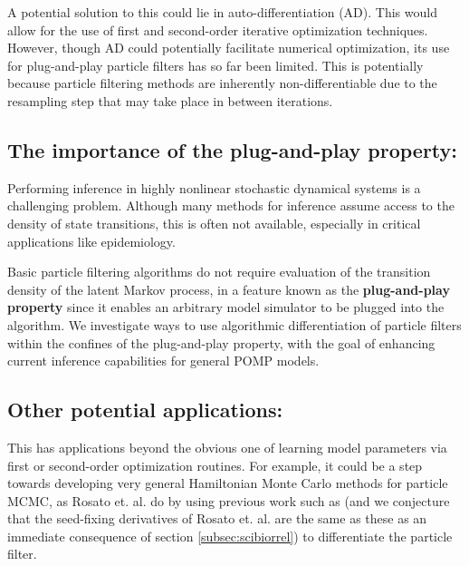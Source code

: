 \documentclass[9pt,twocolumn,twoside]{pnas-new}
\begin{document}
A potential solution to this could lie in auto-differentiation (AD). This would allow for the use of first and second-order iterative optimization techniques. However, though AD could potentially facilitate numerical optimization, its use for plug-and-play particle filters has so far been limited. This is potentially because particle filtering methods are inherently non-differentiable due to the resampling step that may take place in between iterations. 

\subsection*{The importance of the plug-and-play property:} Performing inference in highly nonlinear stochastic dynamical systems is a challenging problem. Although many methods for inference assume access to the density of state transitions, this is often not available, especially in critical applications like epidemiology.

Basic particle filtering algorithms do not require evaluation of the transition density of the latent Markov process, in a feature known as the \textbf{plug-and-play property} \cite{breto09} since it enables an arbitrary model simulator to be plugged into the algorithm. We investigate ways to use algorithmic differentiation of particle filters within the confines of the plug-and-play property, with the goal of enhancing current inference capabilities for general POMP models.

\subsection*{Other potential applications:} This has applications beyond the obvious one of learning model parameters via first or second-order optimization routines. For example, it could be a step towards developing very general Hamiltonian Monte Carlo methods for particle MCMC, as Rosato et. al. \cite{rosato22b} do by using previous work such as \cite{scibior21, poyiadjis11} (and we conjecture that the seed-fixing derivatives of Rosato et. al. are the same as these as an immediate consequence of section \ref{subsec:scibiorrel}) to differentiate the particle filter. 


\end{document}
